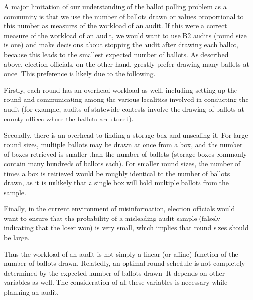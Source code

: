 A major limitation of our understanding of the ballot polling problem as a community is that we use the number of ballots drawn or values proportional to this number \cite{mclaughlin_thesis,bernhard-diss,RI-report} as measures of the workload of an audit. If this were a correct measure of the workload of an audit, we would want to use B2 audits (round size is one) and make decisions about stopping the audit after drawing each ballot, because this leads to the smallest expected number of ballots. As described above, election officials, on the other hand, greatly prefer drawing many ballots at once. This preference is likely due to the following. 
\begin{description}
\item Firstly, each round has an overhead workload as well, including setting up the round and communicating among the various localities involved in conducting the audit (for example, audits of statewide contests involve the drawing of ballots at county offices where the ballots are stored). 
\item Secondly, there is an overhead to finding a storage box and unsealing it. For large round sizes, multiple ballots may be drawn at once from a box, and the number of boxes retrieved is smaller than the number of ballots (storage boxes commonly contain many hundreds of ballots each). For smaller round sizes, the number of times a box is retrieved would be roughly identical to the number of ballots drawn, as it is unlikely that a single box will hold multiple ballots from the sample. 
\item Finally, in the current environment of misinformation, election officials would want to ensure that the probability of a misleading audit sample (falsely indicating that the loser won) is very small, which implies that round sizes should be large. 
\end{description}
Thus the workload of an audit is not simply a linear (or affine) function of the number of ballots drawn. Relatedly, an optimal round schedule is not completely determined by the expected number of ballots drawn. It depends on other variables as well. The consideration of all these variables is necessary while planning an audit. 


